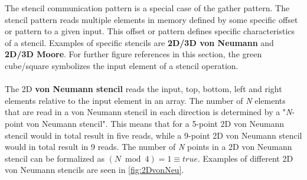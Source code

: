 The stencil communication pattern is a special case of the gather pattern.
The stencil pattern reads multiple elements in memory defined by some specific offset or pattern to a given input.
This offset or pattern defines specific characteristics of a stencil.
Examples of specific stencils are \textbf{2D/3D von Neumann} and \textbf{2D/3D Moore}.
For further figure references in this section, the green cube/square symbolizes the input element of a stencil operation.
\\\\
The 2D \textbf{von Neumann stencil} reads the input, top, bottom, left and right elements relative to the input element in an array.
The number of \textit{N} elements that are read in a von Neumann stencil in each direction is determined by a "\textit{N}-point von Neumann stencil".
This means that for a 5-point 2D von Neumann stencil would in total result in five reads, while a 9-point 2D von Neumann stencil would in total result in 9 reads.
The number of \textit{N} points in a 2D von Neumann stencil can be formalized as $(N\bmod 4)=1\equiv true$.
Examples of different 2D von Neumann stencils are seen in \autoref{fig:2DvonNeu}.
